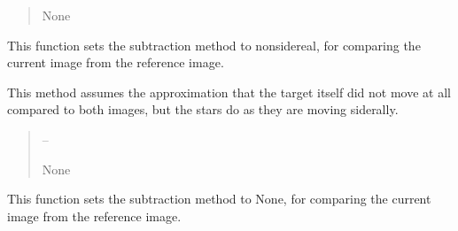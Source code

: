 \documentclass[letterpaper,11pt,english]{sphinxmanual}
\begin{document}
\begin{savenotes}
\begin{fulllineitems}
\begin{savenotes}
\begin{fulllineitems}
\begin{quote}
\begin{description}
\sphinxAtStartPar
None

\end{description}\end{quote}

\end{fulllineitems}\end{savenotes}


\begin{savenotes}\begin{fulllineitems}
\label{\detokenize{code/opihiexarata.gui.selector:opihiexarata.gui.selector.TargetSelectorWindow.__connect_push_button_mode_non_sidereal}}
\pysigstartsignatures
{}
\pysigstopsignatures
\sphinxAtStartPar
This function sets the subtraction method to non\sphinxhyphen{}sidereal, for
comparing the current image from the reference image.

\sphinxAtStartPar
This method assumes the approximation that the target itself did not
move at all compared to both images, but the stars do as they are
moving siderally.
\begin{quote}\begin{description}
\sphinxAtStartPar
{} – 

\sphinxAtStartPar
None

\end{description}\end{quote}

\end{fulllineitems}\end{savenotes}


\begin{savenotes}\begin{fulllineitems}
\label{\detokenize{code/opihiexarata.gui.selector:opihiexarata.gui.selector.TargetSelectorWindow.__connect_push_button_mode_none}}
\pysigstartsignatures
{}
\pysigstopsignatures
\sphinxAtStartPar
This function sets the subtraction method to None, for comparing
the current image from the reference image.


\end{fulllineitems}
\end{savenotes}
\end{fulllineitems}
\end{savenotes}
\end{document}
